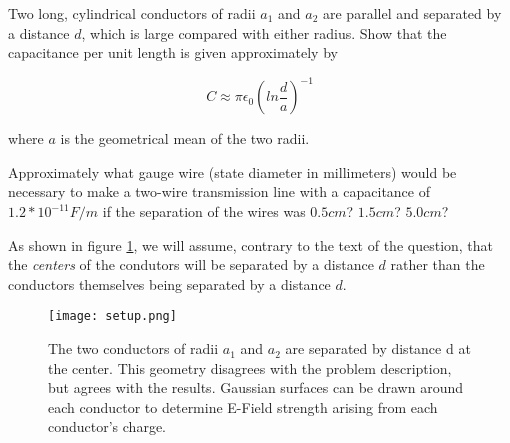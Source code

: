 
\begin{question}
Two long, cylindrical conductors of radii $a_1$ and $a_2$ are parallel
and separated by a distance $d$, which is large compared with either
radius. Show that the capacitance per unit length is given
approximately by

\begin{equation}
  C \approx \pi \epsilon_0 \left( ln \frac d a \right)^{-1}
\end{equation}


where $a$ is the geometrical mean of the two radii.

Approximately what gauge wire (state diameter in millimeters) would be
necessary to make a two-wire transmission line with a capacitance of
$1.2 * 10^{-11} F/m$ if the separation of the wires was $0.5 cm$? $1.5
cm$? $5.0 cm$?
\end{question}

As shown in figure \ref{fig::1::7::setup}, we will assume, contrary to
the text of the question, that the \emph{centers} of the condutors
will be separated by a distance $d$ rather than the conductors
themselves being separated by a distance $d$.

\begin{figure}
  \label{fig::1::7::setup}

  \begin{center}

    \texttt{[image: setup.png]}

    \caption{The two conductors of radii $a_1$ and $a_2$ are separated by
      distance d at the center.  This geometry disagrees with the
      problem description, but agrees with the results.  Gaussian
      surfaces can be drawn around each conductor to determine E-Field
      strength arising from each conductor's charge.}

  \end{center}
\end{figure}
